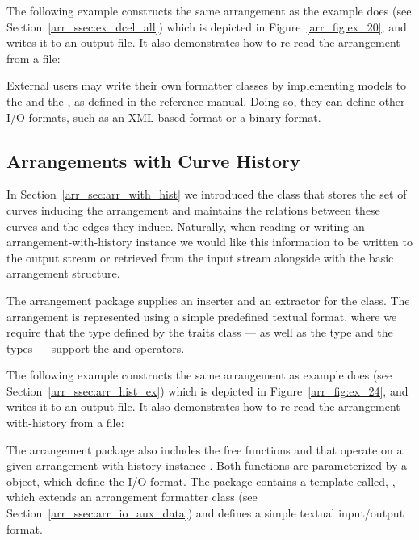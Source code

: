 \begin{ccAdvanced}
The following example constructs the same arrangement as the
example  does
(see Section~\ref{arr_ssec:ex_dcel_all}) which is depicted in
Figure~\ref{arr_fig:ex_20}, and writes it to an output file. It also
demonstrates how to re-read the arrangement from a file:


External users may write their own formatter classes by implementing
models to the  and the
, as defined in the reference manual.
Doing so, they can define other I/O formats, such as an XML-based
format or a binary format.
\end{ccAdvanced}

\subsection{Arrangements with Curve History}
\label{arr_ssec:arr_io_hist}
%
In Section~\ref{arr_sec:arr_with_hist} we introduced the
 class that stores the
set of curves inducing the arrangement and maintains the relations between
these curves and the edges they induce. Naturally, when reading or writing an
arrangement-with-history instance we would like this information to be
written to the output stream or retrieved from the input stream alongside
with the basic arrangement structure.

The arrangement package supplies an inserter and an extractor for the
 class. The arrangement is
represented using a simple predefined textual format, where we require that
the  type defined by the traits class --- as well as the
 type and the  types --- support
the \ccc{<<} and\ccc{>>} operators.

The following example constructs the same arrangement as example
 does
(see Section~\ref{arr_ssec:arr_hist_ex}) which is depicted in
Figure~\ref{arr_fig:ex_24}, and writes it to an output file. It also
demonstrates how to re-read the arrangement-with-history from a file:


\begin{ccAdvanced}
The arrangement package also includes the free functions
 and  that
operate on a given arrangement-with-history instance .
Both functions are parameterized by a  object, which define
the I/O format. The package contains a template called,
, which extends
an arrangement formatter class (see Section~\ref{arr_ssec:arr_io_aux_data})
and defines a simple textual input/output format.
\end{ccAdvanced}

